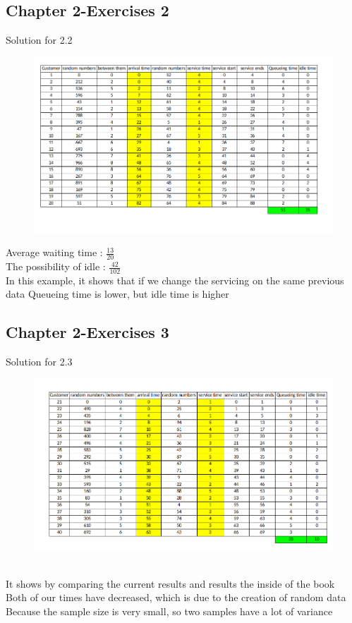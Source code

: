 \documentclass[a4paper,12pt]{article}
\begin{document}
\subsection{Chapter 2-Exercises 2}
Solution for 2.2 \\
\begin{figure}[h!]
    \centering
    \includegraphics[width=1\textwidth]{./Screenshots/Exercise1.2.xlsx.png} 
\end{figure}
Average waiting time : \(\frac{13}{20} \) \\
The possibility of idle : \(\frac{42}{102} \) \\
In this example, it shows that if we change the servicing on the same previous data
Queueing time is lower, but idle time is higher
\newpage
\subsection{Chapter 2-Exercises 3}
Solution for 2.3 
\begin{figure}[h!]
    \centering
    \includegraphics[width=1\textwidth]{./Screenshots/Exercise1.3.xlsx.png} 
\end{figure} \\
It shows by comparing the current results and results the inside of the book \\
Both of our times have decreased, which is due to the creation of random data \\
Because the sample size is very small, so two samples have a lot of variance
\newpage
\end{document}

